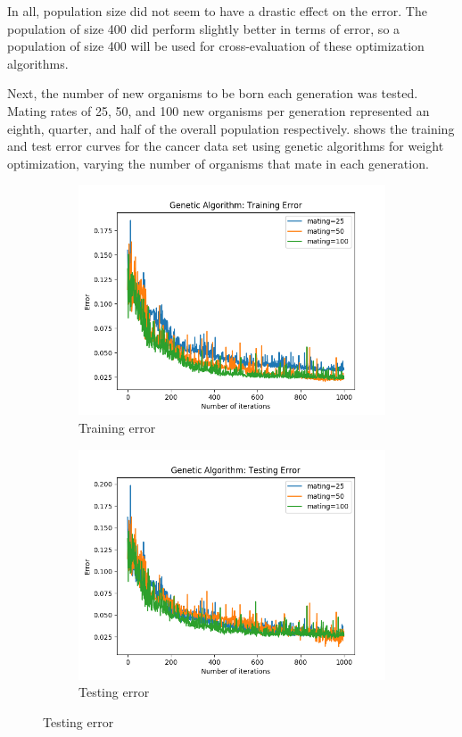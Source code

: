 \documentclass{article}
\begin{document}
        In all, population size did not seem to have a drastic effect on the error. The population of size 400 did perform slightly better in terms of error, so a population of size 400 will be used for cross-evaluation of these optimization algorithms.

        Next, the number of new organisms to be born each generation was tested. Mating rates of 25, 50, and 100 new organisms per generation represented an eighth, quarter, and half of the overall population respectively.  shows the training and test error curves for the cancer data set using genetic algorithms for weight optimization, varying the number of organisms that mate in each generation.

        \begin{figure}[htb]
        \centering

        \begin{subfigure}{0.5\textwidth}
          \includegraphics[width=\linewidth]{out/ga/mating-training.png}
          \caption{Training error}
          \label{fig:ga-mating-1}
        \end{subfigure}\hfil
        \begin{subfigure}{0.5\textwidth}
          \includegraphics[width=\linewidth]{out/ga/mating-testing.png}
          \caption{Testing error}
          \label{fig:ga-mating-2}
        \end{subfigure}


\end{figure}
\end{document}

